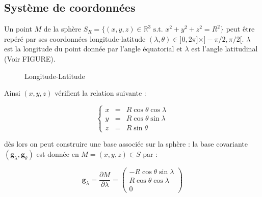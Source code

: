 
\subsection{Système de coordonnées}

Un point $M$ de la sphère $ S_R = \{ (x,y,z) \in \mathbb{R}^3 \text{ s.t. } x^2 + y^2 + z^2 = R^2\}$ peut être repéré par ses coordonnées longitude-latitude $(\lambda, \theta ) \in ]0, 2\pi ] \times ]- \pi/2, \pi/2 [$. $\lambda$ est la longitude du point donnée par l'angle équatorial et $\lambda$ est l'angle latitudinal (Voir FIGURE).

\begin{figure}
\begin{center}
\end{center}
\caption{Longitude-Latitude}
\end{figure}


Ainsi $(x,y,z)$ vérifient la relation suivante :

\begin{equation}
\left\lbrace 
\begin{array}{rcl}
x & = & R \cos \theta \cos \lambda \\
y & = & R \cos \theta \sin \lambda \\
z & = & R \sin \theta
\end{array}
\right.
\end{equation}

dès lors on peut construire une base associée sur la sphère : la base covariante $( \mathbf{g}_{\lambda}, \mathbf{g}_{\theta})$ est donnée en $M = (x,y,z) \in S$ par :

\begin{equation}
\mathbf{g}_{\lambda} = \dfrac{\partial M}{\partial \lambda} = \begin{pmatrix}
- R \cos \theta \sin \lambda \\ 
R \cos \theta \cos \lambda \\ 
0
\end{pmatrix} 
\end{equation}

